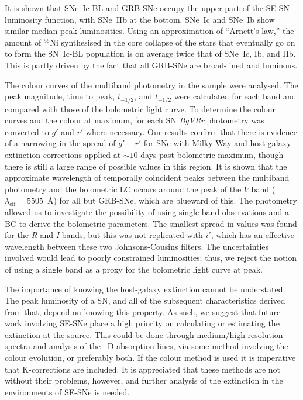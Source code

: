 \documentclass[a4paper,fleqn,usenatbib]{mnras}
\begin{document}
It is shown that SNe~Ic-BL and GRB-SNe occupy the upper part of the SE-SN luminosity function, with SNe~IIb at the bottom. SNe~Ic and SNe~Ib show similar median peak luminosities. Using an approximation of ``Arnett's law,'' the amount of $^{56}$Ni synthesised in the core collapse of the stars that eventually go on to form the SN~Ic-BL population is on average twice that of SNe~Ic, Ib, and IIb. This is partly driven by the fact that all GRB-SNe are broad-lined and luminous. 

The colour curves of the multiband photometry in the sample were analysed. The peak magnitude, time to peak, $t_{-1/2}$, and $t_{+1/2}$ were calculated for each band and compared with those of the bolometric light curve. To determine the colour curves and the colour at maximum, for each SN \textit{BgVRr} photometry was converted to $g'$ and $r'$ where necessary. Our results confirm that there is evidence of a narrowing in the spread of $g'-r'$ for SNe with Milky Way and host-galaxy extinction corrections applied at $\sim 10$ days past bolometric maximum, though there is still a large range of possible values in this region. It is shown that the approximate wavelength of temporally coincident peaks between the multiband photometry and the bolometric LC occurs around the peak of the $V$ band ($\lambda_{\mathrm{eff}}=5505$~\AA) for all but GRB-SNe, which are blueward of this. The photometry allowed us to investigate the possibility of using single-band observations and a BC to derive the bolometric parameters. The smallest spread in values was found for the \textit{R} and \textit{I} bands, but this was not replicated with $i'$, which has an effective wavelength between these two Johnsons-Cousins filters. The uncertainties involved would lead to poorly constrained luminosities; thus, we reject the notion of using a single band as a proxy for the bolometric light curve at peak. 

The importance of knowing the host-galaxy extinction cannot be understated. The peak luminosity of a SN, and all of the subsequent characteristics derived from that, depend on knowing this property. As such, we suggest that future work involving SE-SNe place a high priority on calculating or estimating the extinction at the source. This could be done through medium/high-resolution spectra and analysis of the ~D absorption lines, via some method involving the colour evolution, or preferably both. If the colour method is used it is imperative that K-corrections are included. It is appreciated that these methods are not without their problems, however, and further analysis of the extinction in the environments of SE-SNe is needed.
\end{document}
